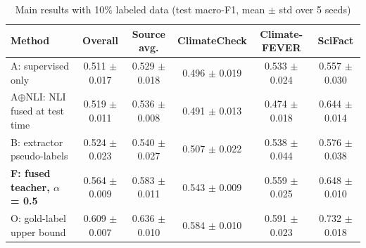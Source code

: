 \begin{table}[t]
\centering
\small
\caption{Main results with 10\% labeled data (test macro-F1, mean $\pm$ std over 5 seeds)}
\begin{tabular}{lccccc}
\toprule
Method & Overall & Source avg. & ClimateCheck & Climate-FEVER & SciFact \\
\midrule
A: supervised only & 0.511 $\pm$ 0.017 & 0.529 $\pm$ 0.018 & 0.496 $\pm$ 0.019 & 0.533 $\pm$ 0.024 & 0.557 $\pm$ 0.030 \\
A$\oplus$NLI: NLI fused at test time & 0.519 $\pm$ 0.011 & 0.536 $\pm$ 0.008 & 0.491 $\pm$ 0.013 & 0.474 $\pm$ 0.018 & 0.644 $\pm$ 0.014 \\
B: extractor pseudo-labels & 0.524 $\pm$ 0.023 & 0.540 $\pm$ 0.027 & 0.507 $\pm$ 0.022 & 0.538 $\pm$ 0.044 & 0.576 $\pm$ 0.038 \\
\textbf{F: fused teacher, $\alpha$ = 0.5} & 0.564 $\pm$ 0.009 & 0.583 $\pm$ 0.011 & 0.543 $\pm$ 0.009 & 0.559 $\pm$ 0.025 & 0.648 $\pm$ 0.010 \\
O: gold-label upper bound & 0.609 $\pm$ 0.007 & 0.636 $\pm$ 0.010 & 0.584 $\pm$ 0.010 & 0.591 $\pm$ 0.023 & 0.732 $\pm$ 0.018 \\
\bottomrule
\end{tabular}
\end{table}

